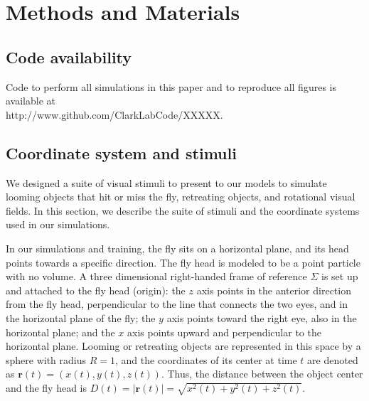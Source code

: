 \documentclass[pdftex,9pt,lineno]{elife}
\begin{document}
\newpage

\section{Methods and Materials}

\subsection{Code availability}
Code to perform all simulations in this paper and to reproduce all figures is available at \\ http://www.github.com/ClarkLabCode/XXXXX.

\subsection{Coordinate system and stimuli}
We designed a suite of visual stimuli to present to our models to simulate looming objects that hit or miss the fly, retreating objects, and rotational visual fields. In this section, we describe the suite of stimuli and the coordinate systems used in our simulations.

In our simulations and training, the fly sits on a horizontal plane, and its head points towards a specific direction. The fly head is modeled to be a point particle with no volume. A three dimensional right-handed frame of reference $\Sigma$ is set up and attached to the fly head (origin): the $z$ axis points in the anterior direction from the fly head, perpendicular to the line that connects the two eyes, and in the horizontal plane of the fly; the $y$ axis points toward the right eye, also in the horizontal plane; and the $x$ axis points upward and perpendicular to the horizontal plane. Looming or retreating objects are represented in this space by a sphere with radius $R=1$, and the coordinates of its center at time $t$ are denoted as $\mathbf{r}(t) = (x(t),y(t),z(t))$. Thus, the distance between the object center and the fly head is $D(t) = |\mathbf{r}(t)| = \sqrt{x^{2}(t)+y^{2}(t)+z^{2}(t)}$.
\end{document}
